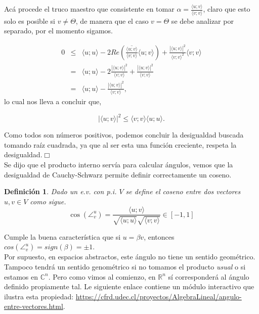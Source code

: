 \documentclass[12pt]{book}
\newtheorem{defi}{Definici\'on}
\def\R{\mathbb{R}}
\def\C{\mathbb{C}}
\begin{document}
{  Acá procede el truco maestro que consistente en tomar $\alpha={\displaystyle \frac{\langle u;v\rangle}{\langle v;v\rangle}}$, claro que esto solo es posible si $v\not =\Theta$, de manera que el caso $v=\Theta$ se debe analizar por separado, por el momento sigamos.
  
    \begin{eqnarray*}
      0&\le&\langle u;u\rangle-2Re\left(\overline{\frac{\langle u;v\rangle}{\langle v;v\rangle}}\langle u;v\rangle\right)+\frac{|\langle u;v\rangle|^2}{\langle v;v\rangle^2}\langle v;v\rangle\\
      &=&\langle u;u\rangle-2\frac{|\langle u;v\rangle|^2}{\langle v;v\rangle}+\frac{|\langle u;v\rangle|^2}{\langle v;v\rangle}\\
      &=&\langle u;u\rangle-\frac{|\langle u;v\rangle|^2}{\langle v;v\rangle},
  \end{eqnarray*}
    lo cual nos lleva a concluir que,
    
    $$|\langle u;v\rangle|^2\le\langle v;v\rangle\langle u;u\rangle.$$
    
    Como todos son números positivos, podemos concluir la desigualdad buscada tomando raíz cuadrada, ya que al ser esta una función creciente, respeta la desigualdad.\hfill $\Box$\\
    

Se dijo que el producto interno servía para calcular ángulos, vemos que la desigualdad de Cauchy-Schwarz permite definir correctamente un coseno.\\

\begin{defi}
Dado un e.v. con p.i. $V$ se define el coseno entre dos vectores $u,v\in V$ como sigue.
$$ \cos(\angle^u_v)=\frac{\langle u; v\rangle}{\sqrt{\langle u; u\rangle} \sqrt{\langle v; v\rangle}}\in[-1,1]$$
\end{defi}

Cumple la buena característica que si $u=\beta v$, entonces $cos(\angle^u_v)=sign(\beta)=\pm1$.\\

Por supuesto, en espacios abstractos, este ángulo no tiene un sentido geométrico.
Tampoco tendrá un sentido genométrico si no tomamos el producto \emph{usual} o si estamos en $\C^n$.
Pero como vimos al comienzo, en $\R^n$ sí corresponderá al ángulo definido propiamente tal.
Le siguiente enlace contiene un módulo interactivo que ilustra esta propiedad: \url{https://cfrd.udec.cl/proyectos/AlgebraLineal/angulo-entre-vectores.html}.

}
\end{document}
